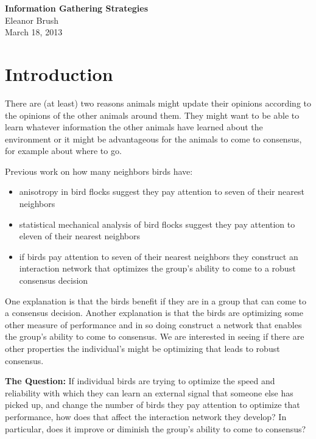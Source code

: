 \documentclass{article}
\begin{document}
\begin{center}
{\bf \LARGE{Information Gathering Strategies}}
\vspace{10pt}
\\ Eleanor Brush
\\ March 18, 2013
\end{center}

\tableofcontents

\section{Introduction}
There are (at least) two reasons animals might update their opinions according to the opinions of the other animals around them.  They might want to be able to learn whatever information the other animals have learned about the environment or it might be advantageous for the animals to come to consensus, for example about where to go.

Previous work on how many neighbors birds have:
\begin{itemize} 
\item anisotropy in bird flocks suggest they pay attention to seven of their nearest neighbors \cite{Ballerini:2007uq}
\item statistical mechanical analysis of bird flocks suggest they pay attention to eleven of their nearest neighbors \cite{Bialek:2012fk}
\item if  birds pay attention to seven of their nearest neighbors they construct an interaction network that optimizes the group's ability to come to a robust consensus decision \cite{Young:2013kx}
\end{itemize}

One explanation is that the birds benefit if they are in a group that can come to a consensus decision.  Another explanation is that the birds are optimizing some other measure of performance and in so doing construct a network that enables the group's ability to come to consensus.  We are interested in seeing if there are other properties the individual's might be optimizing that leads to robust consensus.

{\bf The Question:} If individual birds are trying to optimize the speed and reliability with which they can learn an external signal that someone else has picked up, and change the number of birds they pay attention to optimize that performance, how does that affect the interaction network they develop?  In particular, does it improve or diminish the group's ability to come to consensus?
\end{document}
